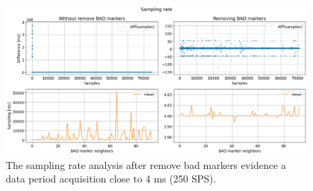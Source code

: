 
\begin{figure}
\begin{centering}
% 
\includegraphics[width=1\textwidth]{Cap3/Figures/sampling_rate_analysis.png}
\par\end{centering}
\caption[Sampling rate analysis after remove bad markers.]{The sampling rate analysis after remove bad markers evidence a data period acquisition close to 4 ms (250 SPS).}
\label{fig:sampling_rate_analysis}
\end{figure}